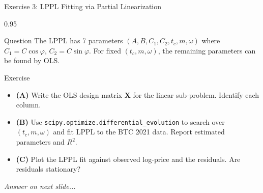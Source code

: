 \documentclass[9pt, aspectratio=169, t]{beamer}
\begin{document}
\begin{frame}{Exercise 3: LPPL Fitting via Partial Linearization}
    \begin{cminipage}{0.95\textwidth}
    \begin{alertblock}{Question}
        The LPPL has 7 parameters $(A, B, C_1, C_2, t_c, m, \omega)$ where $C_1 = C\cos\varphi$, $C_2 = C\sin\varphi$.
        For fixed $(t_c, m, \omega)$, the remaining parameters can be found by OLS.
    \end{alertblock}

    \vspace{0.15cm}

    \begin{block}{Exercise}
        \begin{itemize}\setlength{\itemsep}{3pt}
            \item \textcolor{MainBlue}{\textbf{(A)}} Write the OLS design matrix $\mathbf{X}$ for the linear sub-problem. Identify each column.
            \item \textcolor{MainBlue}{\textbf{(B)}} Use \texttt{scipy.optimize.differential\_evolution} to search over $(t_c, m, \omega)$ and fit LPPL to the BTC 2021 data. Report estimated parameters and $R^2$.
            \item \textcolor{MainBlue}{\textbf{(C)}} Plot the LPPL fit against observed log-price and the residuals. Are residuals stationary?
        \end{itemize}
    \end{block}

    \vspace{0.15cm}

    \begin{center}
        \textit{Answer on next slide...}
    \end{center}
    \end{cminipage}
\end{frame}
\end{document}

